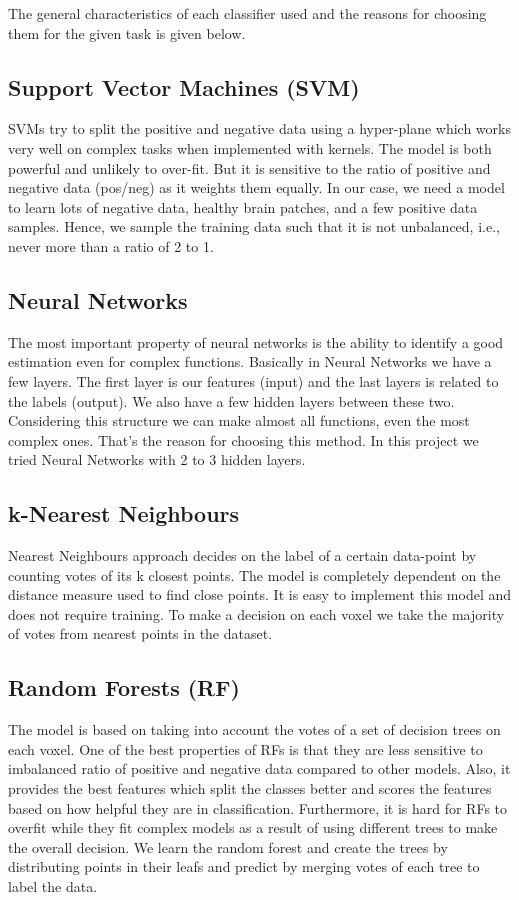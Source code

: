 \documentclass{article} %
\begin{document}
The general characteristics of each classifier used and the reasons for choosing them for the given task is given below. 
\subsection{Support Vector Machines (SVM)} 
SVMs try to split the positive and negative data using a hyper-plane which works very well on complex tasks when implemented with kernels. The model is both powerful and unlikely to over-fit. But it is sensitive to the ratio of positive and negative data (pos/neg) as it weights them equally. In our case, we need a model to learn lots of negative data, healthy brain patches, and a few positive data samples. Hence, we sample the training data such that it is not unbalanced, i.e., never more than a ratio of 2 to 1.

\subsection{ Neural Networks} 
The most important property of neural networks is the ability to identify a good estimation even for complex functions. Basically in Neural Networks we have a few layers. The first layer is our features (input) and the last layers is related to the labels (output). We also have a few hidden layers between these two. Considering this structure we can make almost all functions, even the most complex ones. That’s the reason for choosing this method. In this project we tried Neural Networks with 2 to 3 hidden layers.

\subsection{k-Nearest Neighbours} 
Nearest Neighbours approach decides on the label of a certain data-point by counting votes of its k closest points. The model is completely dependent on the distance measure used to find close points. It is easy to implement this model and does not require training. To make a decision on each voxel we take the majority of votes from nearest points in the dataset. 

\subsection{Random Forests (RF)} 
The model is based on taking into account the votes of a set of decision trees on each voxel. One of the best properties of RFs is that they are less sensitive to imbalanced ratio of positive and negative data compared to other models. Also, it provides the best features which split the classes better and scores the features based on how helpful they are in classification. Furthermore, it is hard for RFs to overfit while they fit complex models as a result of using different trees to make the overall decision. We learn the random forest and create the trees by distributing points in their leafs and predict by merging votes of each tree to label the data.
\end{document}
